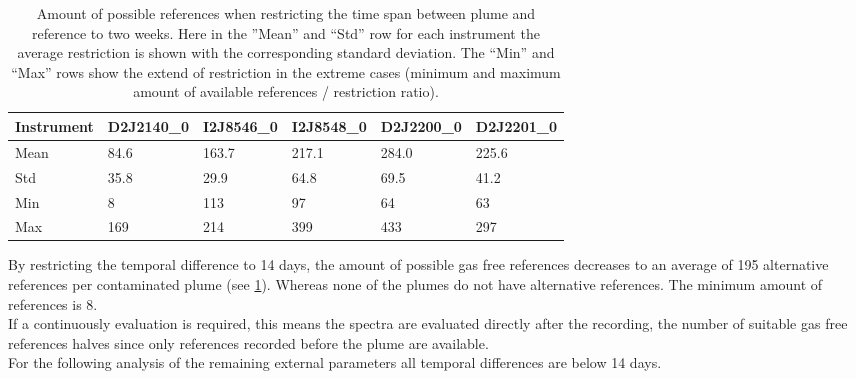 \begin{table}[h]
	\begin{tabular}{|p{2cm}|p{2cm}|p{2cm}|p{2cm}|p{2cm}|p{2cm}|}
		Instrument	&D2J2140\_0&I2J8546\_0& I2J8548\_0&D2J2200\_0&D2J2201\_0\\
		\toprule
		Mean&84.6 &163.7 &217.1&284.0 &225.6 \\
		\midrule
		Std&
		35.8&%
		29.9&%
		64.8&%
		69.5&%
		41.2\\%
		\midrule
		Min&
		8 &%
		113&%
		97 &%
		64&%
		63\\%
		\midrule
		Max&
		169&%
		214&%
		399&%
		433&%
		297\\%
		\bottomrule
	\end{tabular}
	\caption{Amount of possible references when restricting the time span between plume and reference to two weeks. Here in the ”Mean” and “Std” row for each  instrument the average restriction is shown with the corresponding standard deviation. The “Min” and “Max” rows show the extend of restriction in the extreme cases (minimum and maximum amount of available references / restriction ratio).}
	\label{Tab:refstime}
\end{table}	
By restricting the temporal difference to 14 days, the amount of possible gas free references decreases to an average of 195 alternative references per contaminated plume (see \cref{Tab:refstime}). Whereas none of the plumes do not have alternative references. The minimum amount of references is 8.\\
If a continuously evaluation is required, this means the spectra are evaluated directly after the recording, the number of suitable gas free references halves since only references recorded before the plume are available.\\
For the following analysis of the remaining external parameters all temporal differences are below 14 days.
